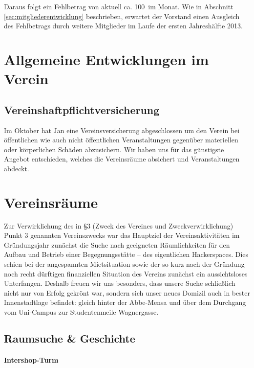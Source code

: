 \documentclass[10pt,DIV16]{scrartcl}
\begin{document}
Daraus folgt ein Fehlbetrag von aktuell ca. 100\EUR\ im Monat. Wie 
in Abschnitt \ref{sec:mitgliederentwicklung} beschrieben, erwartet 
der Vorstand einen Ausgleich des Fehlbetrags durch weitere Mitglieder
im Laufe der ersten Jahreshälfte 2013. 

\section{Allgemeine Entwicklungen im Verein}

\subsection{Vereinshaftpflichtversicherung}

Im Oktober hat Jan eine Vereinsversicherung abgeschlossen um den 
Verein bei öffentlichen wie auch nicht öffentlichen Veranstaltungen 
gegenüber materiellen oder körperlichen Schäden abzusichern. Wir 
haben uns für das günstigste Angebot entschieden, welches die 
Vereinsräume absichert und Veranstaltungen abdeckt.


\section{Vereinsräume}

Zur Verwirklichung des in §3 (Zweck des Vereines und Zweckverwirklichung)
Punkt 3 genannten Vereinszwecks war das Hauptziel der Vereinsaktivitäten im
Gründungsjahr zunächst die Suche nach geeigneten Räumlichkeiten für den Aufbau
und Betrieb einer Begegnungsstätte -- des eigentlichen Hackerspaces.  Dies
schien bei der angespannten Mietsituation sowie der so kurz nach der Gründung
noch recht dürftigen finanziellen Situation des Vereins zunächst ein
aussichtsloses Unterfangen.  Deshalb freuen wir uns besonders, dass unsere
Suche schließlich nicht nur von Erfolg gekrönt war, sondern sich unser neues
Domizil auch in bester Innenstadtlage befindet:  gleich hinter der Abbe-Mensa
und über dem Durchgang vom Uni-Campus zur Studentenmeile Wagnergasse.

\subsection{Raumsuche \& Geschichte}

\paragraph{Intershop-Turm}
\end{document}
